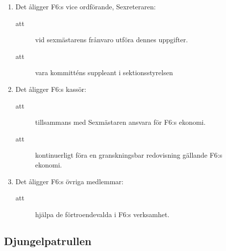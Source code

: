 \documentclass[11pt,a4paper]{article}
\begin{document}
\begin{enumerate}[\thesubsection .1]
  \item Det åligger F6:s vice ordförande, Sexreteraren:
    \begin{description}
      \item[att] vid sexmästarens frånvaro utföra dennes uppgifter.
      \item[att] vara kommitténs suppleant i sektionsstyrelsen
    \end{description}

  \item Det åligger F6:s kassör:
    \begin{description}
      \item[att] tillsammans med Sexmästaren ansvara för F6:s ekonomi.
      \item[att] kontinuerligt föra en granskningsbar redovisning gällande F6:s ekonomi.
    \end{description}

  \item Det åligger F6:s övriga medlemmar:
    \begin{description}
      \item[att] hjälpa de förtroendevalda i F6:s verksamhet.
    \end{description}

\end{enumerate}

\subsection{Djungelpatrullen}
\end{document}

